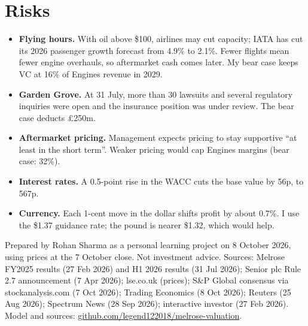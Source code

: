 \documentclass[10pt]{article}
\begin{document}
\begin{minipage}[t]{0.485\textwidth}
\section{Risks}
{\small
\begin{itemize}[leftmargin=1em,itemsep=0.3ex]
\item \textbf{Flying hours.} With oil above \$100, airlines may cut capacity; IATA has cut its 2026 passenger growth forecast from 4.9\% to 2.1\%. Fewer flights mean fewer engine overhauls, so aftermarket cash comes later. My bear case keeps VC at 16\% of Engines revenue in 2029.
\item \textbf{Garden Grove.} At 31 July, more than 30 lawsuits and several regulatory inquiries were open and the insurance position was under review. The bear case deducts \pounds250m.
\item \textbf{Aftermarket pricing.} Management expects pricing to stay supportive ``at least in the short term''. Weaker pricing would cap Engines margins (bear case: 32\%).
\item \textbf{Interest rates.} A 0.5-point rise in the WACC cuts the base value by 56p, to 567p.
\item \textbf{Currency.} Each 1-cent move in the dollar shifts profit by about 0.7\%. I use the \$1.37 guidance rate; the pound is nearer \$1.32, which would help.
\end{itemize}}
\end{minipage}

\vfill
{\scriptsize\color{ink2}Prepared by Rohan Sharma as a personal learning project on 8 October 2026, using prices at the 7 October close. Not investment advice. Sources: Melrose FY2025 results (27 Feb 2026) and H1 2026 results (31 Jul 2026); Senior plc Rule 2.7 announcement (7 Apr 2026); lse.co.uk (prices); S\&P Global consensus via stockanalysis.com (7 Oct 2026); Trading Economics (8 Oct 2026); Reuters (25 Aug 2026); Spectrum News (28 Sep 2026); interactive investor (27 Feb 2026). Model and sources: \href{https://github.com/legend122018/melrose-valuation}{github.com/legend122018/melrose-valuation}.}
\end{document}
